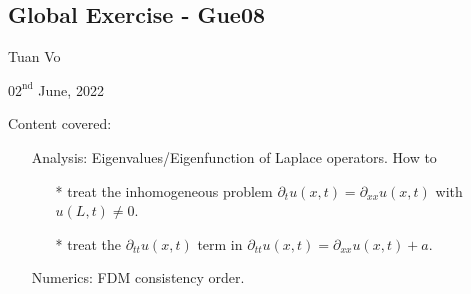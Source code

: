 \documentclass[12pt]{article}
\begin{document}
\begin{center}
	\section*{Global Exercise - Gue08}
\end{center}
\begin{center}
	Tuan Vo
\end{center}
\begin{center}
	$02^{\text{nd}}$ June, 2022
\end{center}
Content covered:
\begin{itemize}
	\item[\checkmark] Analysis: Eigenvalues/Eigenfunction of Laplace operators. How to
	      \begin{itemize}
		      \item[*] treat the inhomogeneous problem $\partial_{t}u(x,t) = \partial_{xx}u(x,t)$ with $u(L,t) \neq 0$.
		      \item[*] treat the $\partial_{tt} u(x,t)$ term in $\partial_{tt} u(x,t) =   \partial_{xx}u(x,t) + a$.
	      \end{itemize}
	\item[\checkmark] Numerics: FDM consistency order.
\end{itemize}
\end{document}
